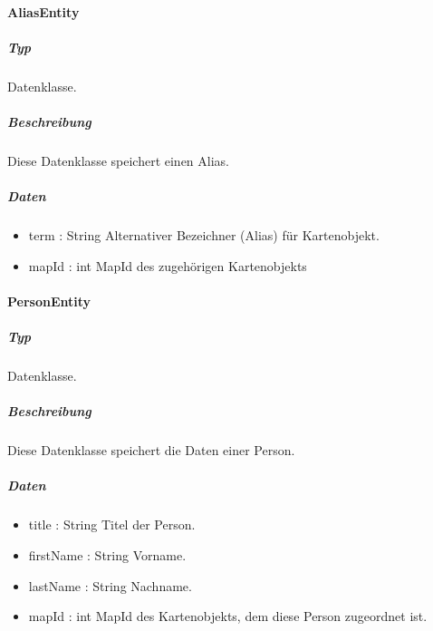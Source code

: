 \paragraph{AliasEntity}
\subparagraph*{Typ}
Datenklasse.
\subparagraph*{Beschreibung}
Diese Datenklasse speichert einen Alias.
\subparagraph*{Daten}
\begin{itemize}
    \item term : String Alternativer Bezeichner (Alias) für Kartenobjekt.
    \item mapId : int MapId des zugehörigen Kartenobjekts
\end{itemize}

\paragraph{PersonEntity}
\subparagraph*{Typ}
Datenklasse.
\subparagraph*{Beschreibung}
Diese Datenklasse speichert die Daten einer Person.
\subparagraph*{Daten}
\begin{itemize}
    \item title : String Titel der Person.
    \item firstName : String Vorname.
    \item lastName : String Nachname.
    \item mapId : int MapId des Kartenobjekts, dem diese Person zugeordnet ist.
\end{itemize}